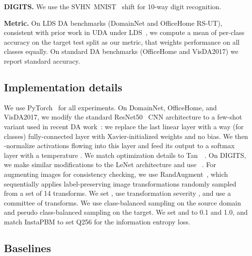 \documentclass[10pt,twocolumn,letterpaper]{article}
\begin{document}
\par\noindent\textbf{DIGITS.} We use the SVHN~\cite{netzer2011reading}MNIST~\cite{lecun1998gradient} shift for 10-way digit recognition.

\par\noindent\textbf{Metric.} On LDS DA benchmarks (DomainNet and OfficeHome RS-UT), consistent with prior work in UDA under LDS~\cite{tan2019generalized,jiang2020implicit}, we compute a mean of per-class accuracy on the target test split as our metric, that weights performance on all classes equally. On standard DA benchmarks (OfficeHome and VisDA2017) we report standard accuracy. 

\vspace{-5pt}
\subsection{Implementation details}
\label{ref:implementation}
\vspace{-5pt}

\noindent We use PyTorch~\cite{paszke2019pytorch} for all experiments. On DomainNet, OfficeHome, and VisDA2017, we modify the standard ResNet50~\cite{he2016deep} CNN architecture to a few-shot variant used in recent DA work~\cite{chen2018closer,saito2019semi,tan2019generalized}: we replace the last linear layer with a  way (for  classes) fully-connected layer with Xavier-initialized weights and no bias. We then -normalize activations flowing into this layer and feed its output to a softmax layer with a temperature . We match optimization details to Tan~\etal~\cite{tan2019generalized}. On DIGITS, we make similar modifications to the LeNet architecture and use ~\cite{hoffman2017cycada}. For augmenting images for consistency checking, we use RandAugment~\cite{cubuk2020randaugment}, which sequentially applies  label-preserving image transformations randomly sampled from a set of 14 transforms. We set , use transformation severity , and use a committee of  transforms. We use class-balanced sampling on the source domain and pseudo class-balanced sampling on the target. We set  and  to 0.1 and 1.0, and match InstaPBM to set Q256 for the information entropy loss.

\vspace{-5pt}
\subsection{Baselines}
\label{ref:baselines}
\vspace{-5pt}
\end{document}
